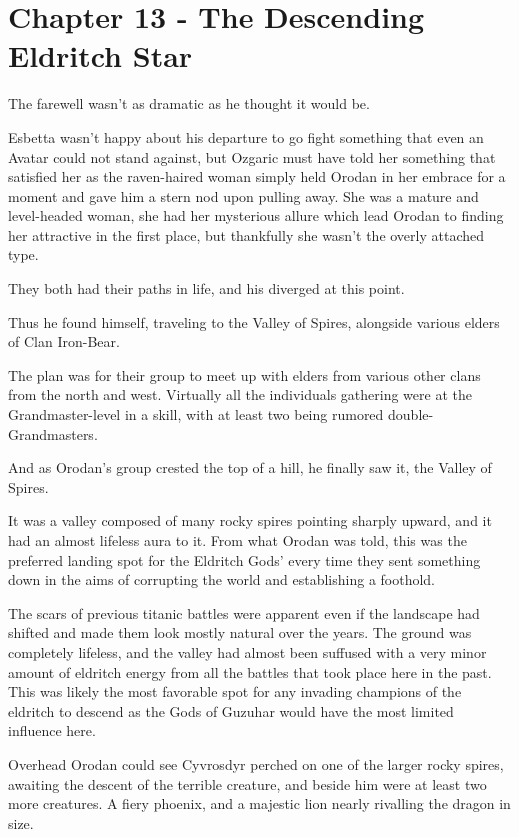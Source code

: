 \documentclass[a4paper,10pt]{book}
\begin{document}
\section*{Chapter 13 - The Descending Eldritch Star}
%
\par
The farewell wasn’t as dramatic as he thought it would be.\par
Esbetta wasn’t happy about his departure to go fight something that even an Avatar could not stand against, but Ozgaric must have told her something that satisfied her as the raven-haired woman simply held Orodan in her embrace for a moment and gave him a stern nod upon pulling away. She was a mature and level-headed woman, she had her mysterious allure which lead Orodan to finding her attractive in the first place, but thankfully she wasn’t the overly attached type.\par
They both had their paths in life, and his diverged at this point.\par
Thus he found himself, traveling to the Valley of Spires, alongside various elders of Clan Iron-Bear.\par
The plan was for their group to meet up with elders from various other clans from the north and west. Virtually all the individuals gathering were at the Grandmaster-level in a skill, with at least two being rumored double-Grandmasters.\par
And as Orodan’s group crested the top of a hill, he finally saw it, the Valley of Spires.\par
It was a valley composed of many rocky spires pointing sharply upward, and it had an almost lifeless aura to it. From what Orodan was told, this was the preferred landing spot for the Eldritch Gods’ every time they sent something down in the aims of corrupting the world and establishing a foothold.\par
The scars of previous titanic battles were apparent even if the landscape had shifted and made them look mostly natural over the years. The ground was completely lifeless, and the valley had almost been suffused with a very minor amount of eldritch energy from all the battles that took place here in the past. This was likely the most favorable spot for any invading champions of the eldritch to descend as the Gods of Guzuhar would have the most limited influence here.\par
Overhead Orodan could see Cyvrosdyr perched on one of the larger rocky spires, awaiting the descent of the terrible creature, and beside him were at least two more creatures. A fiery phoenix, and a majestic lion nearly rivalling the dragon in size.\par
\end{document}
